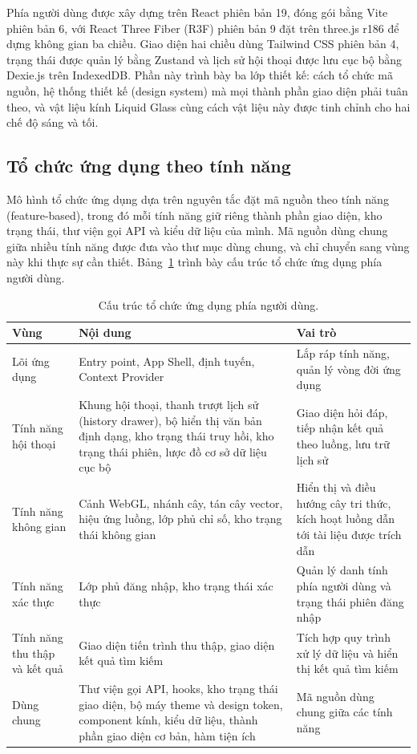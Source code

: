 Phía người dùng được xây dựng trên React phiên bản 19, đóng gói bằng Vite phiên bản 6, với React Three Fiber (R3F) phiên bản 9 đặt trên three.js r186 để dựng không gian ba chiều. Giao diện hai chiều dùng Tailwind CSS phiên bản 4, trạng thái được quản lý bằng Zustand và lịch sử hội thoại được lưu cục bộ bằng Dexie.js trên IndexedDB. Phần này trình bày ba lớp thiết kế: cách tổ chức mã nguồn, hệ thống thiết kế (design system) mà mọi thành phần giao diện phải tuân theo, và vật liệu kính Liquid Glass cùng cách vật liệu này được tinh chỉnh cho hai chế độ sáng và tối.

\subsection{Tổ chức ứng dụng theo tính năng}
\label{subsec:to-chuc-frontend}

Mô hình tổ chức ứng dụng dựa trên nguyên tắc đặt mã nguồn theo tính năng (feature-based), trong đó mỗi tính năng giữ riêng thành phần giao diện, kho trạng thái, thư viện gọi API và kiểu dữ liệu của mình. Mã nguồn dùng chung giữa nhiều tính năng được đưa vào thư mục dùng chung, và chỉ chuyển sang vùng này khi thực sự cần thiết. Bảng~\ref{tab:cau-truc-frontend} trình bày cấu trúc tổ chức ứng dụng phía người dùng.

\begin{table}[htbp]
    \centering
    \caption{Cấu trúc tổ chức ứng dụng phía người dùng.}
    \label{tab:cau-truc-frontend}
    \small
    \begin{tabularx}{\textwidth}{@{}>{\raggedright\arraybackslash}p{2.8cm}>{\raggedright\arraybackslash}p{5.8cm}>{\raggedright\arraybackslash}X@{}}
        \toprule
        \textbf{Vùng} & \textbf{Nội dung} & \textbf{Vai trò} \\
        \midrule
        Lõi ứng dụng & Entry point, App Shell, định tuyến, Context Provider & Lắp ráp tính năng, quản lý vòng đời ứng dụng \\
        Tính năng hội thoại & Khung hội thoại, thanh trượt lịch sử (history drawer), bộ hiển thị văn bản định dạng, kho trạng thái truy hồi, kho trạng thái phiên, lược đồ cơ sở dữ liệu cục bộ & Giao diện hỏi đáp, tiếp nhận kết quả theo luồng, lưu trữ lịch sử \\
        Tính năng không gian & Cảnh WebGL, nhánh cây, tán cây vector, hiệu ứng luồng, lớp phủ chỉ số, kho trạng thái không gian & Hiển thị và điều hướng cây tri thức, kích hoạt luồng dẫn tới tài liệu được trích dẫn \\
        Tính năng xác thực & Lớp phủ đăng nhập, kho trạng thái xác thực & Quản lý danh tính phía người dùng và trạng thái phiên đăng nhập \\
        Tính năng thu thập và kết quả & Giao diện tiến trình thu thập, giao diện kết quả tìm kiếm & Tích hợp quy trình xử lý dữ liệu và hiển thị kết quả tìm kiếm \\
        Dùng chung & Thư viện gọi API, hooks, kho trạng thái giao diện, bộ máy theme và design token, component kính, kiểu dữ liệu, thành phần giao diện cơ bản, hàm tiện ích & Mã nguồn dùng chung giữa các tính năng \\
        \bottomrule
    \end{tabularx}
\end{table}


